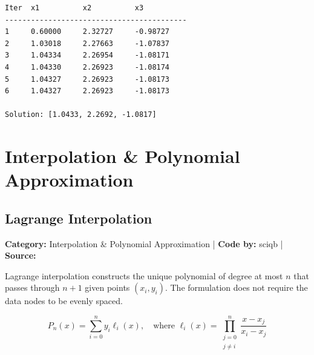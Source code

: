 \documentclass[10pt,a4paper]{report}
\begin{document}
\begin{tcolorbox}[colback=termbg,colframe=primary,title=\textbf{Program Execution Output \& Convergence Table},boxrule=1pt,arc=2mm]
\begin{lstlisting}[style=terminal_output]
Iter  x1          x2          x3          
------------------------------------------
1     0.60000     2.32727     -0.98727    
2     1.03018     2.27663     -1.07837    
3     1.04334     2.26954     -1.08171    
4     1.04330     2.26923     -1.08174    
5     1.04327     2.26923     -1.08173    
6     1.04327     2.26923     -1.08173    

Solution: [1.0433, 2.2692, -1.0817]
\end{lstlisting}
\end{tcolorbox}

\newpage

\chapter{Interpolation \& Polynomial Approximation}


\section{Lagrange Interpolation}
\textbf{Category:} \textcolor{secondary}{Interpolation \& Polynomial Approximation} \quad | \quad \textbf{Code by:} \textcolor{secondary}{sciqb} \quad | \quad \textbf{Source:} \texttt{}

Lagrange interpolation constructs the unique polynomial of degree at most $n$ that passes through $n+1$ given points $(x_i, y_i)$. The formulation does not require the data nodes to be evenly spaced.

\begin{tcolorbox}[colback=theorybg,colframe=theoryframe,title=\textbf{Mathematical Theory \& Formulation},boxrule=1pt,arc=2mm]
\[
P_n(x) = \sum_{i=0}^n y_i \ell_i(x), \quad \text{where } \ell_i(x) = \prod_{\substack{j=0 \\ j \neq i}}^n \frac{x - x_j}{x_i - x_j}
\]
\end{tcolorbox}
\end{document}
